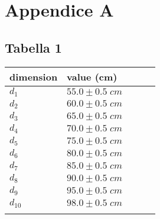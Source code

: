 \documentclass[11pt,a4paper]{article}
\begin{document}
\section{Appendice A}
\subsection{Tabella 1}
\begin{longtable}[]{@{}lllll@{}}
    \toprule
    dimension & value (cm) \tabularnewline
    \midrule
    \endhead
    $d_1$ & $55.0 \pm 0.5 \; cm$ \tabularnewline
    $d_2$ & $60.0 \pm 0.5 \; cm$ \tabularnewline
    $d_3$ & $65.0 \pm 0.5 \; cm$ \tabularnewline
    $d_4$ & $70.0 \pm 0.5 \; cm$ \tabularnewline
    $d_5$ & $75.0 \pm 0.5 \; cm$ \tabularnewline
    $d_6$ & $80.0 \pm 0.5 \; cm$ \tabularnewline
    $d_7$ & $85.0 \pm 0.5 \; cm$ \tabularnewline
    $d_8$ & $90.0 \pm 0.5 \; cm$ \tabularnewline
    $d_9$ & $95.0 \pm 0.5 \; cm$ \tabularnewline
    $d_{10}$ & $98.0 \pm 0.5 \; cm$ \tabularnewline
    \bottomrule
    \label{output3}
\end{longtable}
\end{document}

